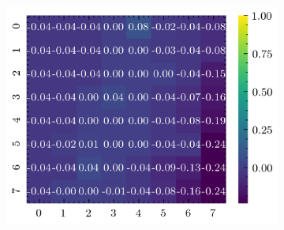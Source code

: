 \documentclass[../document.tex]{subfiles}
\begin{document}
\begin{figure}[H]
\begin{subfigure}[b]{0.19\textwidth}
        \includegraphics[width=\linewidth]{../img/5/quarry/false_negative/heatmap-2d-4.png}
    \end{subfigure}  


\end{figure}
\end{document}
